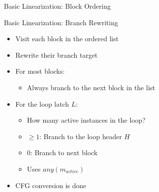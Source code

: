 \begin{frame}{Basic Linearization: Block Ordering}
\begin{minipage}[t]{0.38\linewidth}
\end{minipage}

\end{frame}


\begin{frame}{Basic Linearization: Branch Rewriting}

\begin{minipage}[t]{0.55\linewidth}

\begin{itemize}
    \item Visit each block in the ordered list
    \item Rewrite their branch target
\end{itemize}

\begin{itemize}
    \item For most blocks:
    \begin{itemize}
        \item Always branch to the next block in the list
    \end{itemize}
    \item For the loop latch $L$:
    \begin{itemize}
        \item How many active instances in the loop?
        \item $\geq 1$: Branch to the loop header $H$
        \item $0$: Branch to next block
        \item Uses $any(m_{active})$
    \end{itemize}
\end{itemize}

\begin{itemize}
    \item CFG conversion is done
\end{itemize}

\end{minipage}\begin{minipage}[t]{0.42\linewidth}

\vspace{0.1ex}


\end{minipage}
\end{frame}
